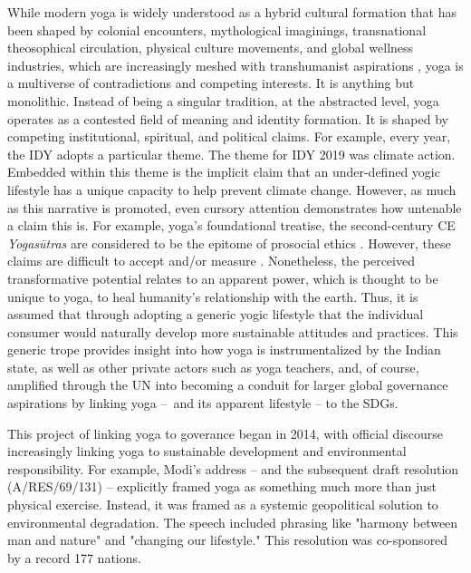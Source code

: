 \documentclass[11pt]{article}
\begin{document}
While modern yoga is widely understood as a hybrid cultural formation that has been  shaped by colonial encounters, mythological imaginings, transnational theosophical  circulation, physical culture movements, and global wellness industries, which are increasingly meshed with transhumanist aspirations \cite{coskuner2016,ferrandez2024,mccartneyTranshumanist,mccartneyVedic}, yoga is a multiverse of contradictions and competing interests. It is anything but monolithic. Instead of being a singular tradition, at the abstracted level, yoga operates as a contested field of meaning and identity formation. It is shaped by competing institutional, spiritual, and political claims. For example, every year, the IDY adopts a particular theme. The theme for IDY 2019 was climate action. Embedded within this theme is the implicit claim that an under-defined yogic lifestyle has a unique capacity to help prevent climate change. However, as much as this narrative is promoted, even cursory attention demonstrates how untenable a claim this is. For example, yoga's foundational treatise, the second-century CE \emph{Yogasūtras} are considered to be the epitome of prosocial ethics \cite{ranganathan2008,ranganathan2024}. However, these claims are difficult to accept and/or measure \cite{mccartney2021,mccartney2026}. Nonetheless, the perceived transformative potential relates to an apparent power, which is thought to be unique to yoga, to heal humanity’s relationship with the earth. Thus, it is assumed that through adopting a generic yogic lifestyle that the individual consumer would naturally develop more sustainable attitudes and practices. This generic trope provides insight into how yoga is instrumentalized by the Indian state, as well as other private actors such as yoga teachers, and, of course, amplified through the UN into becoming a conduit for larger global governance aspirations by linking yoga – and its apparent lifestyle – to the SDGs.

This project of linking yoga to goverance began in 2014, with official discourse increasingly linking yoga to sustainable development and environmental responsibility. For example, Modi's address – and the subsequent draft resolution (A/RES/69/131) – explicitly framed yoga as something much more than just physical exercise. Instead, it was framed as a systemic geopolitical solution to environmental degradation. The speech included phrasing like "harmony between man and nature" and "changing our lifestyle." This resolution was co-sponsored by a record 177 nations. 
\end{document}
